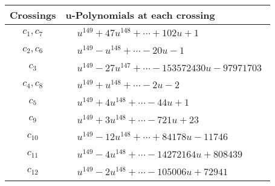 \documentclass[1p]{elsarticle_modified}
\theoremstyle{definition}
\begin{document}
\begin{tabular}{m{50pt}|m{274pt}}
Crossings & \hspace{64pt}u-Polynomials at each crossing \\
\hline $$\begin{aligned}c_{1},c_{7}\end{aligned}$$&$\begin{aligned}
&u^{149}+47 u^{148}+\cdots+102 u+1
\end{aligned}$\\
\hline $$\begin{aligned}c_{2},c_{6}\end{aligned}$$&$\begin{aligned}
&u^{149}- u^{148}+\cdots-20 u-1
\end{aligned}$\\
\hline $$\begin{aligned}c_{3}\end{aligned}$$&$\begin{aligned}
&u^{149}-27 u^{147}+\cdots-153572430 u-97971703
\end{aligned}$\\
\hline $$\begin{aligned}c_{4},c_{8}\end{aligned}$$&$\begin{aligned}
&u^{149}+u^{148}+\cdots-2 u-2
\end{aligned}$\\
\hline $$\begin{aligned}c_{5}\end{aligned}$$&$\begin{aligned}
&u^{149}+4 u^{148}+\cdots-44 u+1
\end{aligned}$\\
\hline $$\begin{aligned}c_{9}\end{aligned}$$&$\begin{aligned}
&u^{149}+3 u^{148}+\cdots-721 u+23
\end{aligned}$\\
\hline $$\begin{aligned}c_{10}\end{aligned}$$&$\begin{aligned}
&u^{149}-12 u^{148}+\cdots+84178 u-11746
\end{aligned}$\\
\hline $$\begin{aligned}c_{11}\end{aligned}$$&$\begin{aligned}
&u^{149}-4 u^{148}+\cdots-14272164 u+808439
\end{aligned}$\\
\hline $$\begin{aligned}c_{12}\end{aligned}$$&$\begin{aligned}
&u^{149}-2 u^{148}+\cdots-105006 u+72941
\end{aligned}$\\
\hline
\end{tabular}\\~\\
\end{document}
